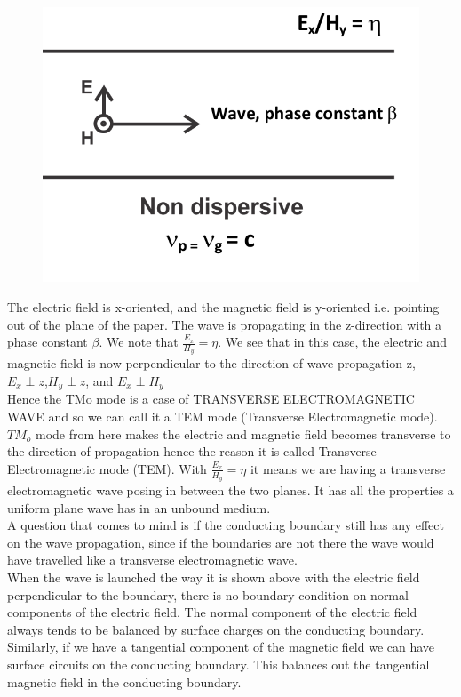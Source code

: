 \begin{figure}[h]
\centering
\includegraphics[width=1\linewidth]{./graphics/silas6}
\caption{}
\end{figure}
The electric field is x-oriented, and the magnetic field is y-oriented i.e. pointing out of the plane of the paper. The wave is propagating in the z-direction with a phase constant $\beta$. We note that $\frac{E_{x}}{H_{y}} = \eta$. We see that in this case, the electric and magnetic field is now perpendicular to the direction of wave propagation z, $E_{x}\perp z$,$H_{y}\perp z$, and $E_{x}\perp H_{y}$\\
Hence the TMo mode is a case of TRANSVERSE ELECTROMAGNETIC WAVE and so we can call it a TEM mode (Transverse Electromagnetic mode). $TM_o$ mode from here makes the electric and magnetic field becomes transverse to the direction of propagation hence the reason it is called Transverse Electromagnetic mode (TEM). With $\frac{E_{x}}{H_{y}} = \eta$ it means we are having a transverse electromagnetic wave posing in between the two planes. It has all the properties a uniform plane wave has in an unbound medium.\\
A question that comes to mind is if the conducting boundary still has any effect on the wave propagation, since if the boundaries are not there the wave would have travelled like a transverse electromagnetic wave.\\
When the wave is launched the way it is shown above with the electric field perpendicular to the boundary, there is no boundary condition on normal components of the electric field. The normal component of the electric field always tends to be balanced by surface charges on the conducting boundary.\\ Similarly, if we have a tangential component of the magnetic field we can have surface circuits on the conducting boundary. This balances out the tangential magnetic field in the conducting boundary.\\
